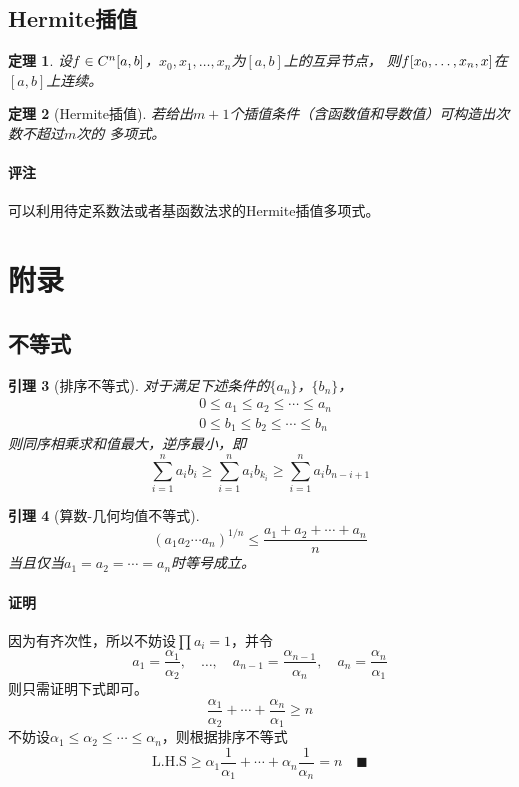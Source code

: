 \documentclass[12pt, a4paper]{article}
\theoremstyle{margin}
\newtheorem{thm}{定理}
\newtheorem{lemma}[thm]{引理}
\newcommand{\f}{\mathnormal{f}}
\newcommand{\lhs}{\text{L.H.S}}
\newcommand{\remark}{\paragraph{评注}}
\newcommand{\proof}{\paragraph{证明}}
\begin{document}

\subsection{Hermite插值}
  \begin{thm}
    设$\f\in C^n[a,b]$，$x_0,x_1,\dots,x_n$为$[a, b]$上的互异节点，
    则$\f[x_0,\dots,x_n,x]$在$[a, b]$上连续。
  \end{thm}

  \begin{thm}[Hermite插值]
    若给出$m+1$个插值条件（含函数值和导数值）可构造出次数不超过$m$次的
    多项式。
  \end{thm}
  \remark
    可以利用待定系数法或者基函数法求的Hermite插值多项式。

\newpage
\section{附录}
\subsection{不等式}

  \begin{lemma}[排序不等式]
    \label{lemma: 排序不等式}
    对于满足下述条件的$\{a_n\}$，$\{b_n\}$，
    \[\begin{split}
      & 0 \le a_1\le a_2\le\cdots\le a_n \\
      & 0 \le b_1\le b_2\le\cdots\le b_n
    \end{split}\]
    则同序相乘求和值最大，逆序最小，即
    \[
      \sum_{i=1}^n a_ib_i \ge \sum_{i=1}^n a_ib_{k_i}
      \ge \sum_{i=1}^n a_ib_{n-i+1}
    \]
  \end{lemma}

  \begin{lemma}[算数-几何均值不等式]
    \[
      (a_1a_2\cdots a_n)^{1/n} \le \frac{a_1+a_2+\cdots+a_n}{n}
    \]
    当且仅当$a_1 = a_2 = \cdots = a_n$时等号成立。
  \end{lemma}
  \proof
    因为有齐次性，所以不妨设$\prod a_i=1$，并令
    \[
      a_1=\frac{\alpha_1}{\alpha_2},\quad
      \dots,\quad
      a_{n-1} = \frac{\alpha_{n-1}}{\alpha_n},\quad
      a_n = \frac{\alpha_n}{\alpha_1}
    \]
    则只需证明下式即可。
    \[
      \frac{\alpha_1}{\alpha_2} + \cdots + \frac{\alpha_n}{\alpha_1}
      \ge n
    \]
    不妨设$\alpha_1 \le \alpha_2 \le \cdots \le \alpha_n$，则根据排序不等式
    \[
      \lhs \ge \alpha_1\frac{1}{\alpha_1} + \cdots + \alpha_n\frac{1}{\alpha_n}
       = n \quad\blacksquare
    \]
\end{document}
